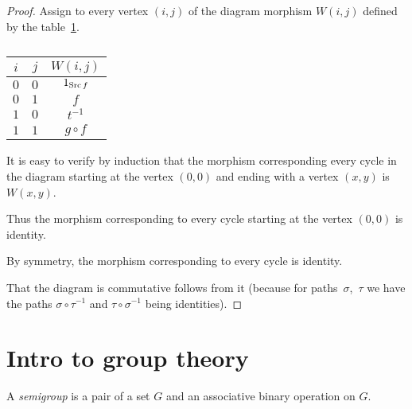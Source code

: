 \begin{proof}
Assign to every vertex $(i,j)$ of the diagram morphism $W(i,j)$
defined by the table~\ref{square-table}.

\begin{table}[ht]
\caption{\label{square-table}}


\begin{tabular}{|c|c|c|}
\hline 
$i$ & $j$ & $W(i,j)$\tabularnewline
\hline 
\hline 
$0$ & $0$ & $1_{\operatorname{Src} f}$\tabularnewline
\hline 
$0$ & $1$ & $f$\tabularnewline
\hline 
$1$ & $0$ & $t^{-1}$\tabularnewline
\hline 
$1$ & $1$ & $g\circ f$\tabularnewline
\hline 
\end{tabular}
\end{table}


It is easy to verify by induction that the morphism corresponding
every cycle in the diagram starting at the vertex $(0,0)$ and ending
with a vertex $(x,y)$ is $W(x,y)$.

Thus the morphism corresponding to every cycle starting at the vertex
$(0,0)$ is identity.

By symmetry, the morphism corresponding to every cycle is identity.

That the diagram is commutative follows from it (because for paths~$\sigma$,~$\tau$
we have the paths $\sigma\circ\tau^{-1}$ and $\tau\circ\sigma^{-1}$
being identities).
\end{proof}

\section{Intro to group theory}
\begin{defn}
A \emph{semigroup} is a pair of a set $G$ and an associative
binary operation on $G$.
\end{defn}

